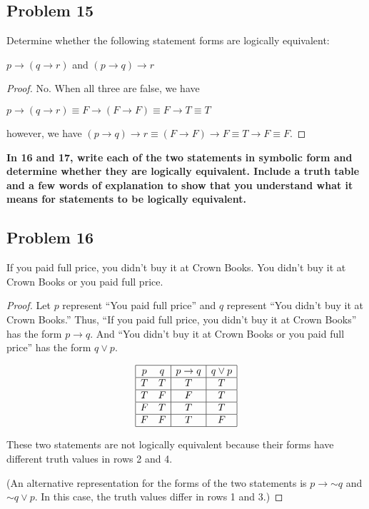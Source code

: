 \documentclass[14pt]{extarticle}
\begin{document}
\subsection{Problem 15}
Determine whether the following statement forms are logically equivalent:

$p \to (q \to r)$ and $(p \to q) \to r$

\begin{proof}
No. When all three are false, we have

$p \to (q \to r) \equiv F \to (F \to F) \equiv F \to T \equiv T$

however, we have $(p \to q) \to r \equiv (F \to F) \to F \equiv T \to F \equiv
F$.
\end{proof}

{\bf In 16 and 17, write each of the two statements in symbolic form and
determine whether they are logically equivalent. Include a truth table and a few
words of explanation to show that you understand what it means for statements to
be logically equivalent.}

\subsection{Problem 16}
If you paid full price, you didn’t buy it at Crown Books. You didn’t buy it at
Crown Books or you paid full price.

\begin{proof}
Let $p$ represent “You paid full price” and $q$ represent “You didn’t buy it at
Crown Books.” Thus, “If you paid full price, you didn’t buy it at Crown Books”
has the form $p \to q$. And “You didn’t buy it at Crown Books or you paid full
price” has the form $q \vee p$.

$$
\begin{array}{|cc|c|c|}
\hline
p & q & p \to q & q \vee p \\
\hline
T & T & T & T \\
\hline
T & F & F & T \\
\hline
F & T & T & T \\
\hline
F & F & T & F \\
\hline
\end{array}
$$

These two statements are not logically equivalent because their forms have
different truth values in rows 2 and 4.

(An alternative representation for the forms of the two statements is $p \to
{\sim q}$ and ${\sim q} \vee p$. In this case, the truth values differ in rows 1
and 3.)
\end{proof}
\end{document}
